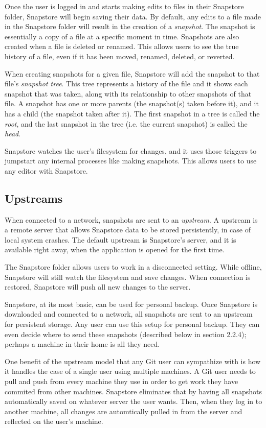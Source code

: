 Once the user is logged in and starts making edits to files in their Snapstore folder, Snapstore will begin saving their data. By default, any edits to a file made in the Snapstore folder will result in the creation of a \textit{snapshot}. The snapshot is essentially a copy of a file at a specific moment in time. Snapshots are also created when a file is deleted or renamed. This allows users to see the true history of a file, even if it has been moved, renamed, deleted, or reverted. 

When creating snapshots for a given file, Snapstore will add the snapshot to that file's \textit{snapshot tree}. This tree represents a history of the file and it shows each snapshot that was taken, along with its relationship to other snapshots of that file. A snapshot has one or more parents (the snapshot(s) taken before it), and it has a child (the snapshot taken after it). The first snapshot in a tree is called the \textit{root}, and the last snapshot in the tree (i.e. the current snapshot) is called the \textit{head}.

Snapstore watches the user's filesystem for changes, and it uses those triggers to jumpstart any internal processes like making snapshots. This allows users to use any editor with Snapstore.

\subsection{Upstreams}

When connected to a network, snapshots are sent to an \textit{upstream}. A upstream is a remote server that allows Snapstore data to be stored persistently, in case of local system crashes. The default upstream is Snapstore's server, and it is available right away, when the application is opened for the first time.

The Snapstore folder allows users to work in a disconnected setting. While offline, Snapstore will still watch the filesystem and save changes. When connection is restored, Snapstore will push all new changes to the server.

Snapstore, at its most basic, can be used for personal backup. Once Snapstore is downloaded and connected to a network, all snapshots are sent to an upstream for persistent storage. Any user can use this setup for personal backup. They can even decide where to send these snapshots (described below in section 2.2.4); perhaps a machine in their home is all they need.

One benefit of the upstream model that any Git user can sympathize with is how it handles the case of a single user using multiple machines. A Git user needs to pull and push from every machine they use in order to get work they have commited from other machines. Snapstore eliminates that by having all snapshots automatically saved on whatever server the user wants. Then, when they log in to another machine, all changes are automtically pulled in from the server and reflected on the user's machine.

